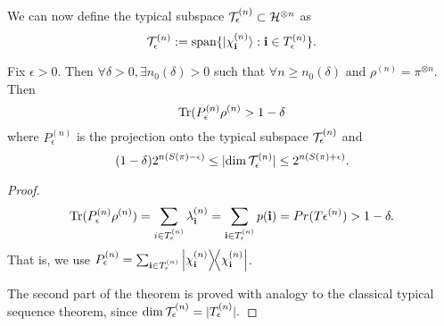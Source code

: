 We can now define the typical subspace $\mathcal T_\epsilon^{(n)}\subset \mathcal H^{\otimes n}$ as
\begin{equation}
    \mathcal T_\epsilon^{(n)} := \text{span}\{\lvert\chi_{\boldsymbol{\mathbf{i}}}^{(n)}\rangle : \boldsymbol{\mathbf{i}} \in T_\epsilon^{(n)}\}.
\end{equation}

\begin{thm}
    Fix $\epsilon>0$. Then $\forall \delta >0, \exists n_0(\delta) >0$ such that $\forall n \geq n_0(\delta)$ and $\rho^{(n)}=\pi^{\otimes n}$. Then
    \begin{equation}
        \operatorname{Tr}(P_\epsilon^{(n)} \rho^{(n)} > 1-\delta
    \end{equation}
    where $P_\epsilon^{(n)}$ is the projection onto the typical subspace $\mathcal T_\epsilon^{(n)}$ and
    \begin{equation}
        (1-\delta) 2^{n(S(\pi)-\epsilon)}\leq \lvert\dim \mathcal T_\epsilon^{(n)}\rvert \leq 2^{n(S(\pi)+\epsilon)}.
    \end{equation}
\end{thm}
\begin{proof}
\begin{equation}
    \operatorname{Tr}(P_\epsilon^{(n)} \rho^{(n)}) = \sum_{i\in T_\epsilon^{(n)}} \lambda_{\boldsymbol{\mathbf{i}}}^{(n)} =\sum_{\boldsymbol{\mathbf{i}} \in T_\epsilon^{(n)}} p({\boldsymbol{\mathbf{i}}}) = Pr(T\epsilon^{(n)})>1-\delta.
\end{equation}
That is, we use $P_\epsilon^{(n)} = \sum_{\boldsymbol{\mathbf{i}}\in T_\epsilon^{(n)}}\left\lvert{\chi_{\boldsymbol{\mathbf{i}}}^{(n)}}\middle\rangle\!\middle\langle{\chi_{\boldsymbol{\mathbf{i}}}^{(n)}}\right\rvert$.

The second part of the theorem is proved with analogy to the classical typical sequence theorem, since $\dim \mathcal T_\epsilon^{(n)}=|T_\epsilon^{(n)}|.$
\end{proof}

